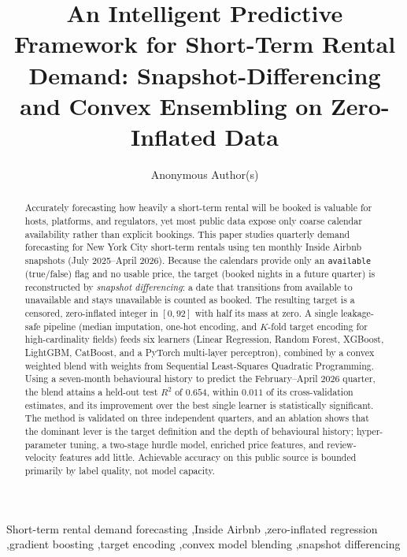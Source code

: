 \documentclass[review,12pt]{elsarticle}
\begin{document}
\begin{frontmatter}

\title{An Intelligent Predictive Framework for Short-Term Rental Demand:
Snapshot-Differencing and Convex Ensembling on Zero-Inflated Data}

\author{Anonymous Author(s)}

\begin{abstract}
Accurately forecasting how heavily a short-term rental will be booked is valuable
for hosts, platforms, and regulators, yet most public data expose only coarse
calendar availability rather than explicit bookings. This paper studies quarterly
demand forecasting for New York City short-term rentals using ten monthly Inside
Airbnb snapshots (July 2025--April 2026). Because the calendars provide only an
\texttt{available} (true/false) flag and no usable price, the target (booked
nights in a future quarter) is reconstructed by \emph{snapshot differencing}: a
date that transitions from available to unavailable and stays unavailable is
counted as booked. The resulting target is a censored, zero-inflated integer in
$[0,92]$ with half its mass at zero. A single leakage-safe pipeline (median
imputation, one-hot encoding, and $K$-fold target encoding for high-cardinality
fields) feeds six learners (Linear Regression, Random Forest, XGBoost, LightGBM,
CatBoost, and a PyTorch multi-layer perceptron), combined by a convex weighted
blend with weights from Sequential Least-Squares Quadratic Programming. Using a
seven-month behavioural history to predict the February--April 2026 quarter, the
blend attains a held-out test $R^2$ of $0.654$, within $0.011$ of its
cross-validation estimates, and its improvement over the best single learner is
statistically significant. The method is validated on three independent
quarters, and an ablation shows that the dominant lever is the target definition
and the depth of behavioural history; hyper-parameter tuning, a two-stage hurdle
model, enriched price features, and review-velocity features add little.
Achievable accuracy on this public source is bounded primarily by label quality,
not model capacity.
\end{abstract}

\begin{keyword}
Short-term rental demand forecasting \sep Inside Airbnb \sep zero-inflated regression \sep gradient boosting \sep target encoding \sep convex model blending \sep snapshot differencing
\end{keyword}

\end{frontmatter}
\end{document}
